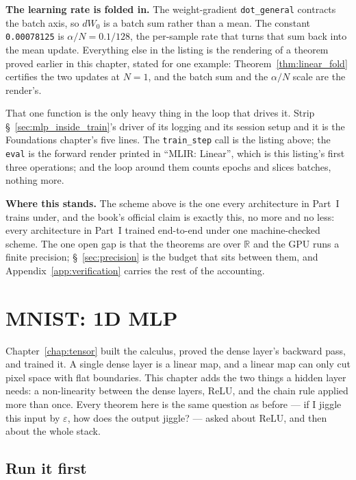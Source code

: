 \medskip\noindent \textbf{The learning rate is folded in.} The weight-gradient
\texttt{dot\_general} contracts the batch axis, so $dW_0$ is a batch sum
rather than a mean. The constant \texttt{0.00078125} is
$\alpha/N = 0.1/128$, the per-sample rate that turns that sum back into
the mean update. Everything else in the listing is the rendering of a theorem
proved earlier in this chapter, stated for one example: Theorem~\ref{thm:linear_fold}
certifies the two updates at $N = 1$, and the batch sum and the $\alpha/N$
scale are the render's.

\medskip\noindent That one function is the only heavy thing in the loop that
drives it. Strip \S~\ref{sec:mlp_inside_train}'s driver of its logging
and its session setup and it is the Foundations chapter's five lines. The
\texttt{train\_step} call is the listing above; the \texttt{eval} is the
forward render printed in ``MLIR: Linear'', which is this listing's first
three operations; and the loop around them counts epochs and slices
batches, nothing more.

\medskip\noindent\textbf{Where this stands.} The scheme above is the one
every architecture in Part~I trains under, and the book's official claim
is exactly this, no more and no less: every architecture in Part~I
trained end-to-end under one machine-checked scheme. The one open gap
is that the theorems are over \(\mathbb{R}\) and the GPU runs a finite
precision; \S~\ref{sec:precision} is the budget that sits between them,
and Appendix~\ref{app:verification} carries the rest of the accounting.

\chapter{MNIST: 1D MLP}
\label{chap:mlp}


Chapter~\ref{chap:tensor} built the calculus, proved the dense layer's
backward pass, and trained it. A single dense layer is a linear map, and
a linear map can only cut pixel space with flat boundaries. This chapter
adds the two things a hidden layer needs: a non-linearity between the
dense layers, ReLU, and the chain rule applied more than once. Every
theorem here is the same question as before --- if I jiggle this
input by \(\varepsilon\), how does the output jiggle? --- asked
about ReLU, and then about the whole stack.

\section{Run it first}
\label{sec:mlp_runit}

